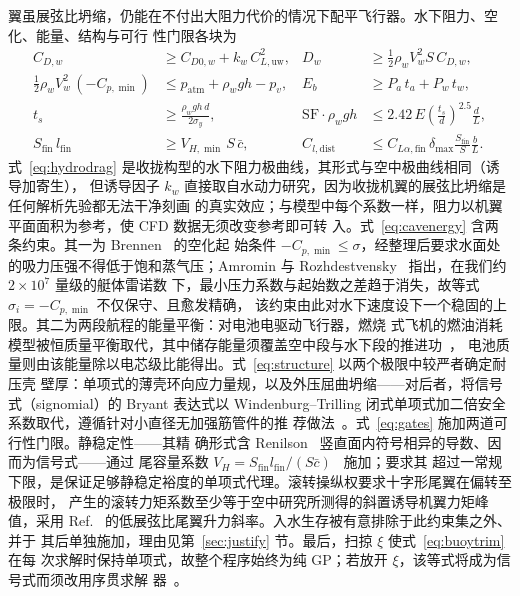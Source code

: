 \documentclass[a4paper,10pt,twocolumn]{ctexart}
\begin{document}
翼虽展弦比坍缩，仍能在不付出大阻力代价的情况下配平飞行器。水下阻力、空化、能量、结构与可行
性门限各块为
\begin{align}
C_{D,w} &\ge C_{D0,w} + k_w\,C_{L,\text{uw}}^2, & D_w &\ge \tfrac12\rho_w V_w^2 S\,C_{D,w},\label{eq:hydrodrag}\\
\tfrac12\rho_w V_w^2\,(-C_{p,\min}) &\le p_{\text{atm}} + \rho_w g h - p_v,
      & E_b &\ge P_a\,t_a + P_w\,t_w, \label{eq:cavenergy}\\
t_s &\ge \frac{\rho_w g h\,d}{2\sigma_y}, & \mathrm{SF}\cdot\rho_w g h &\le 2.42\,E\!\left(\tfrac{t_s}{d}\right)^{2.5}\!\!\frac{d}{L}, \label{eq:structure}\\
S_{\text{fin}}\,l_{\text{fin}} &\ge V_{H,\min}\,S\,\bar c, & C_{l,\text{dist}} &\le C_{L\alpha,\text{fin}}\,\delta_{\max}\frac{S_{\text{fin}}}{S}\frac{b}{L}. \label{eq:gates}
\end{align}
式~\eqref{eq:hydrodrag} 是收拢构型的水下阻力极曲线，其形式与空中极曲线相同（诱导加寄生），
但诱导因子 $k_w$ 直接取自水动力研究，因为收拢机翼的展弦比坍缩是任何解析先验都无法干净刻画
的真实效应；与模型中每个系数一样，阻力以机翼平面面积为参考，使 CFD 数据无须改变参考即可转
入。式~\eqref{eq:cavenergy} 含两条约束。其一为 Brennen~\cite{brennen2014cavitation} 的空化起
始条件 $-C_{p,\min}\le\sigma$，经整理后要求水面处的吸力压强不得低于饱和蒸气压；Amromin 与
Rozhdestvensky~\cite{amromin2022cavitation} 指出，在我们约 $2\times10^{7}$ 量级的艇体雷诺数
下，最小压力系数与起始数之差趋于消失，故等式 $\sigma_i=-C_{p,\min}$ 不仅保守、且愈发精确，
该约束由此对水下速度设下一个稳固的上限。其二为两段航程的能量平衡：对电池电驱动飞行器，燃烧
式飞机的燃油消耗模型被恒质量平衡取代，其中储存能量须覆盖空中段与水下段的推进功~\cite{allen2000propulsion,lin2026energies}，
电池质量则由该能量除以电芯级比能得出。式~\eqref{eq:structure} 以两个极限中较严者确定耐压壳
壁厚：单项式的薄壳环向应力量规，以及外压屈曲坍缩——对后者，将信号式（signomial）的 Bryant
表达式以 Windenburg--Trilling 闭式单项式加二倍安全系数取代，遵循针对小直径无加强筋管件的推
荐做法~\cite{shinoka2024structural}。式~\eqref{eq:gates} 施加两道可行性门限。静稳定性——其精
确形式含 Renilson~\cite{renilson2018submarine} 竖直面内符号相异的导数、因而为信号式——通过
尾容量系数 $V_H=S_{\text{fin}}l_{\text{fin}}/(S\bar c)$~\cite{hoerner1985fluid} 施加；要求其
超过一常规下限，是保证足够静稳定裕度的单项式代理。滚转操纵权要求十字形尾翼在偏转至极限时，
产生的滚转力矩系数至少等于空中研究所测得的斜置诱导机翼力矩峰值，采用
Ref.~\cite{hoerner1985fluid} 的低展弦比尾翼升力斜率。入水生存被有意排除于此约束集之外、并于
其后单独施加，理由见第~\ref{sec:justify} 节。最后，扫掠 $\xi$ 使式~\eqref{eq:buoytrim} 在每
次求解时保持单项式，故整个程序始终为纯 GP；若放开 $\xi$，该等式将成为信号式而须改用序贯求解
器~\cite{hoburg2014geometric,boyd2007tutorial}。
\end{document}
